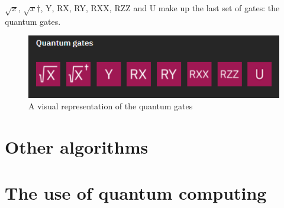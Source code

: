 $\sqrt{x}$, $\sqrt{x}$$\dagger$, Y, RX, RY, RXX, RZZ and U make up the last set of gates: the quantum gates.

\begin{figure} [h]
    \centering
    \includegraphics[width=\textwidth]{img/quantum-gates.PNG}
        \caption{A visual representation of the quantum gates}
        \label{fig:quantum gates}
\end{figure}

\section{Other algorithms}
\label{sec:Other algorithms}
\section{The use of quantum computing}
